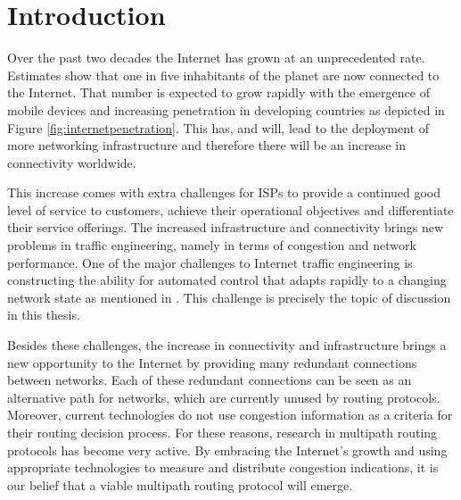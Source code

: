 
\chapter{Introduction}
\ifpdf
  \graphicspath{{1-Introduction/IntroductionFigs/PNG/}{1-Introduction/IntroductionFigs/PDF/}{1-Introduction/IntroductionFigs/}}
\else
  \graphicspath{{1-Introduction/IntroductionFigs/EPS/}{1-Introduction/IntroductionFigs/}}
\fi

Over the past two decades the Internet has grown at an unprecedented rate.
Estimates show that one in five inhabitants of the planet are now connected to
the Internet. That number is expected to grow rapidly with the emergence of
mobile devices and increasing penetration in developing countries as depicted in
Figure \ref{fig:internetpenetration}. This has, and will, lead to the deployment
of more networking infrastructure and therefore there will be an increase in
connectivity worldwide. 


This increase comes with extra challenges for ISPs to provide a continued good
level of service to customers, achieve their operational objectives and
differentiate their service offerings. The increased infrastructure and
connectivity brings new problems in traffic engineering, namely in terms of
congestion and network performance. One of the major challenges to Internet
traffic engineering is constructing the ability for automated control that
adapts rapidly to a changing network state as mentioned in \cite{RFC3272}. This
challenge is precisely the topic of discussion in this thesis.

Besides these challenges, the increase in connectivity and infrastructure brings
a new opportunity to the Internet by providing many redundant connections
between networks. Each of these redundant connections can be seen as an
alternative path for networks, which are currently unused by routing protocols.
Moreover, current technologies do not use congestion information as a criteria
for their routing decision process. For these reasons, research in multipath
routing protocols has become very active. By embracing the Internet's growth and
using appropriate technologies to measure and distribute congestion indications,
it is our belief that a viable multipath routing protocol will emerge.

